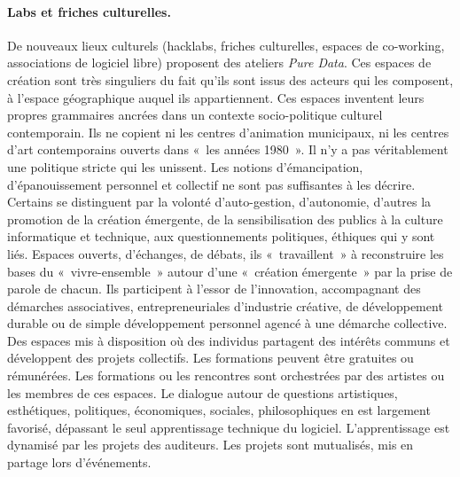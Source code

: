 \documentclass{FramateX}
\begin{document}
\begin{refsection}
\paragraph{Labs et friches culturelles.}
De nouveaux lieux culturels (hacklabs, friches culturelles, espaces de
co-working, associations de logiciel libre) proposent des ateliers \textit{Pure
Data}. Ces espaces de création sont très singuliers du fait
qu'ils sont issus des acteurs qui les composent, à
l'espace géographique auquel ils appartiennent. Ces
espaces inventent leurs propres grammaires ancrées dans un contexte
socio-politique culturel contemporain. Ils ne copient ni les centres
d'animation municipaux, ni les centres d'art
contemporains ouverts dans «~les années 1980~». Il n'y a
pas véritablement une politique stricte qui les unissent. Les notions
d'émancipation, d'épanouissement personnel et collectif ne sont pas
suffisantes à les décrire. Certains se distinguent par la volonté
d'auto-gestion, d'autonomie,
d'autres la promotion de la création émergente, de la
sensibilisation des publics à la culture informatique et technique, aux
questionnements politiques, éthiques qui y sont liés. Espaces ouverts,
d'échanges, de débats, ils «~travaillent~» à reconstruire les bases du
«~vivre-ensemble~» autour d'une «~création émergente~» par la prise de
parole de chacun. Ils participent à l'essor de l'innovation,
accompagnant des démarches associatives, entrepreneuriales d'industrie
créative, de développement durable ou de simple développement personnel
agencé à une démarche collective. Des espaces mis à disposition où des
individus partagent des intérêts communs et développent des projets
collectifs. Les formations peuvent être gratuites ou rémunérées. Les
formations ou les rencontres sont orchestrées par des artistes ou les
membres de ces espaces. Le dialogue autour de questions artistiques,
esthétiques, politiques, économiques, sociales, philosophiques en est
largement favorisé, dépassant le seul apprentissage technique du
logiciel. L'apprentissage est dynamisé par les projets
des auditeurs. Les projets sont mutualisés, mis en partage lors
d'événements.


\end{refsection}
\end{document}
